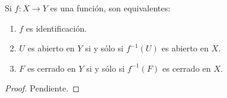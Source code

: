 

\begin{theorem}
Si $f : X \longrightarrow Y$ es una función, son equivalentes:
\begin{enumerate}[label=\textnormal{(\roman*)}]
\item $f$ es identificación.
\item $U$ es abierto en $Y$ si y sólo si $f^{-1}(U)$ es abierto en $X$.
\item $F$ es cerrado en $Y$ si y sólo si $f^{-1}(F)$ es cerrado en $X$.
\end{enumerate}
\end{theorem}

\begin{proof}
Pendiente.
\end{proof}

